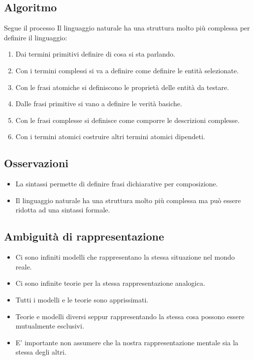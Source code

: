 \documentclass{book}
\begin{document}
    \subsection{Algoritmo}
    Segue il processo Il linguaggio naturale ha una struttura molto più complessa per definire il linguaggio:
    \begin{enumerate}
        \item Dai termini primitivi definire di cosa si sta parlando.
        \item Con i termini complessi si va a definire come definire le entità selezionate.
        \item Con le frasi atomiche si definiscono le proprietà delle entità da testare.
        \item Dalle frasi primitive si vano a definire le verità basiche.
        \item Con le frasi complesse si definisce come comporre le descrizioni complesse.
        \item Con i termini atomici costruire altri termini atomici dipendeti.
    \end{enumerate}

    \subsection{Osservazioni}
    \begin{itemize}
        \item La sintassi permette di definire frasi dichiarative per composizione.
        \item Il linguaggio naturale ha una struttura molto più complessa ma può essere ridotta ad una sintassi formale.
    \end{itemize}

    \subsection{Ambiguità di rappresentazione}
    \begin{itemize}
        \item Ci sono infiniti modelli che rappresentano la stessa situazione nel mondo reale.
        \item Ci sono infinite teorie per la stessa rappresentazione analogica.
        \item Tutti i modelli e le teorie sono apprissimati.
        \item Teorie e modelli diversi seppur rappresentando la stessa cosa possono essere mutualmente esclusivi.
        \item E' importante non assumere che la nostra rappresentazione mentale sia la stessa degli altri.
    \end{itemize}
\end{document}
